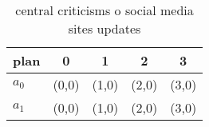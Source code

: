 \documentclass[a4paper]{article}
\begin{document}
\begin{table}
\begin{adjustbox}{width=0.7\columnwidth}
\begin{tabular}{|l|l|l|l|l|}
\hline
\textbf{plan} & \multicolumn{1}{c|}{\textbf{0}} & \multicolumn{1}{c|}{\textbf{1}} & \multicolumn{1}{c|}{\textbf{2}} & \multicolumn{1}{c|}{\textbf{3}} \\ \hline
\textbf{$a_0$}  & (0,0) & (1,0) & (2,0) & (3,0) \\ \hline
\textbf{$a_1$}  & (0,0) & (1,0) & (2,0) & (3,0) \\ \hline
\end{tabular}
\end{adjustbox}
\caption{ central criticisms o social media sites updates 
}
\end{table}
\end{document}
